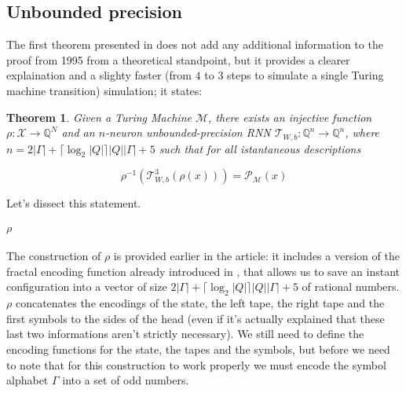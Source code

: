 \documentclass{article}
\newtheorem{theorem}{Theorem}
\begin{document}
\subsection{Unbounded precision}

The first theorem presented in \cite{CHU21} does not add any additional information to the proof from 1995 from a theoretical standpoint, but it provides a clearer explaination and a slighty faster (from $4$ to $3$ steps to simulate a single Turing machine transition) simulation; it states:

\begin{theorem}
    Given a Turing Machine $\mathcal{M}$, there exists an injective function $\rho: \mathcal{X} \rightarrow \mathbb{Q}^N$ and an $n$-neuron unbounded-precision RNN $\mathcal{T}_{W,b}: \mathbb{Q}^n \rightarrow \mathbb{Q}^n$, where $n=2|\Gamma|+\lceil \log_2|Q|\rceil |Q||\Gamma| + 5$ such that for all istantaneous descriptions
    
    $$\rho^{-1}(\mathcal{T}^3_{W,b}(\rho(x))) = \mathcal{P}_{\mathcal{M}}(x)$$
\end{theorem}

Let's dissect this statement.

\paragraph{$\rho$}
The construction of $\rho$ is provided earlier in the article: it includes a version of the fractal encoding function already introduced in \cite{SIE95}, that allows us to save an instant configuration into a vector of size $2|\Gamma|+\lceil \log_2|Q|\rceil |Q||\Gamma| + 5$ of rational numbers. $\rho$ concatenates the encodings of the state, the left tape, the right tape and the first symbols to the sides of the head (even if it's actually explained that these last two informations aren't strictly necessary). We still need to define the encoding functions for the state, the tapes and the symbols, but before we need to note that for this construction to work properly we must encode the symbol alphabet $\Gamma$ into a set of odd numbers.
\end{document}
